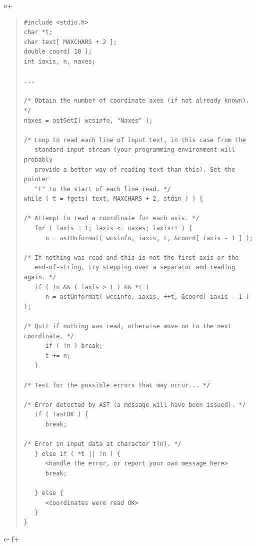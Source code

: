 \documentclass[twoside,11pt]{article}
\begin{document}
c+
\begin{quote}
\small
\begin{verbatim}
#include <stdio.h>
char *t;
char text[ MAXCHARS + 2 ];
double coord[ 10 ];
int iaxis, n, naxes;

...

/* Obtain the number of coordinate axes (if not already known). */
naxes = astGetI( wcsinfo, "Naxes" );

/* Loop to read each line of input text, in this case from the
   standard input stream (your programming environment will probably
   provide a better way of reading text than this). Set the pointer
   "t" to the start of each line read. */
while ( t = fgets( text, MAXCHARS + 2, stdin ) ) {

/* Attempt to read a coordinate for each axis. */
   for ( iaxis = 1; iaxis <= naxes; iaxis++ ) {
      n = astUnformat( wcsinfo, iaxis, t, &coord[ iaxis - 1 ] );

/* If nothing was read and this is not the first axis or the
   end-of-string, try stepping over a separator and reading again. */
   if ( !n && ( iaxis > 1 ) && *t )
      n = astUnformat( wcsinfo, iaxis, ++t, &coord[ iaxis - 1 ] );

/* Quit if nothing was read, otherwise move on to the next coordinate. */
      if ( !n ) break;
      t += n;
   }

/* Test for the possible errors that may occur... */

/* Error detected by AST (a message will have been issued). */
   if ( !astOK ) {
      break;

/* Error in input data at character t[n]. */
   } else if ( *t || !n ) {
      <handle the error, or report your own message here>
      break;

   } else {
      <coordinates were read OK>
   }
}
\end{verbatim}
\normalsize
\end{quote}
c-
f+
\small
\end{document}
